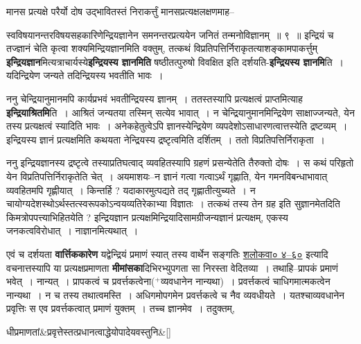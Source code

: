 \documentclass[article,12pt,a4paper]{memoir}
\newcommand{\add}[1]{($^{+}$#1)}
\begin{document}
	मानस प्रत्यक्षे परैर्यो दोष उद्भावितस्तं निराकर्त्तुं मानसप्रत्यक्षलक्षणमाह--  
	  
	स्वविषयानन्तरविषयसहकारिणेन्द्रियज्ञानेन समनन्तरप्रत्ययेन जनितं तन्मनोविज्ञानम् ॥ ९ ॥ इन्द्रियं च तज्ज्ञानं चेति कृत्वा शक्यमिन्द्रियज्ञानमिति वक्तुम्, तत्कथं विप्रतिपत्तिर्निराकृतत्याशङ्कामपाकर्त्तुम् \textbf{इन्द्रियज्ञान}मित्यत्राचार्यस्ये\textbf{इन्द्रियस्य ज्ञानमिति} षष्ठीतत्पुरुषो विवक्षित इति दर्शयति-\textbf{इन्द्रियस्य ज्ञानमि}ति । यदिन्द्रियेण जन्यते तदिन्द्रियस्य भवतीति भावः ।
	\pend
      

	  \pstart ननु चेन्द्रियानुमानमपि कार्यप्रभवं भवतीन्द्रियस्य ज्ञानम् । ततस्तस्यापि प्रत्यक्षत्वं प्राप्तमित्याह \textbf{इन्द्रियाश्रितमि}ति । आश्रितं जन्यतया तस्मिन् सत्येव भावात् । न चेन्द्रियानु\leavevmode{}मानमिन्द्रियेण साक्षाज्जन्यते, येन तस्य प्रत्यक्षत्वं स्यादिति भावः । अनेकहेतुत्वेऽपि ज्ञानस्येन्द्रियेण व्यपदेशोऽसाधारणत्वात्तस्येति द्रष्टव्यम् । इन्द्रियस्य ज्ञानं प्रत्यक्षमिति कथयता नेन्द्रियस्य द्रष्टृत्वमिति दर्शितम् । ततो विप्रतिपत्तिर्निराकृता ।
	\pend
      

	  \pstart ननु इन्द्रियज्ञानस्य द्रष्टृत्वे तस्याप्रतिघत्वाद् व्यवहितस्यापि ग्रहणं प्रसन्येतेति तैरुक्तो दोषः । स कथं परिहृतो येन विप्रतिपत्तिर्निराकृतेति चेत् । अयमाशयः--न ज्ञानं गत्वा गत्वाऽर्थं गृह्णाति, येन गमनविबन्धाभावात् व्यवहितमपि गृह्णीयात् । किन्तर्हि ? यदाकारमुत्पद्यते तद् गृह्णातीत्युच्यते । न चायोग्यदेशस्थोऽर्थस्तत्स्वरूपकोऽन्वयव्यतिरेकाभ्या विज्ञातः । तत्कथं तस्य तेन ग्रह इति सुज्ञानमेतदिति किमत्रोपपत्त्याभिहितयेति ? इन्द्रियज्ञान प्रत्यक्षमिन्द्रियादिसामग्रीजन्यज्ञानं प्रत्यक्षम्, एकस्य जनकत्वविरोधात् । नाज्ञानमित्यथात् ।
	\pend
      

	  \pstart एवं च दर्शयता \textbf{वार्त्तिककारेण} यद्वेन्द्रियं प्रमाणं स्यात् तस्य वार्थेन सङ्गतिः \href{http://sarit.indology.info/?cref=śv.4.60}{शलोकवा०
	४--६०} इत्यादि वचनात्तस्यापि या प्रत्यक्षप्रमाणता \textbf{मीमांसका}दिभिरभ्युपगता सा निरस्ता वेदितव्या । तथाहि--प्रापकं प्रमाणं भवेत् । नान्यत् । प्रापकत्वं च प्रवर्त्तकत्वेना\add{व्यवधानेन नान्यथा} । प्रवर्त्तकत्वं चाधिगमात्मकत्वेन नान्यथा । न च तस्य तथात्वमस्ति । अधिगमोपगमेन प्रवर्त्तकत्वे च नैव व्यवधीयते । यतश्चाव्यवधानेन प्रवृत्तिः स एव प्रवर्त्तकत्वात् प्रमाणं युक्तम् । तच्च ज्ञानमेव । तदुक्तम्, 
	    \pend
	  
	    
	    \stanza[\smallbreak]
	धीप्रमाणतां&प्रवृत्तेस्तत्प्रधानत्वाद्धेयोपादेयवस्तुनि\&[\smallbreak]
\end{document}
